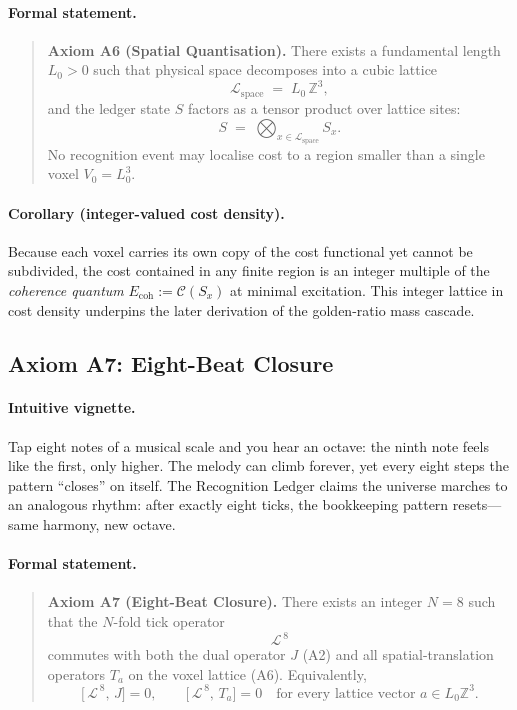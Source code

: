\documentclass[11pt]{article}
\begin{document}
\paragraph{Formal statement.}
\begin{quote}
\textbf{Axiom A6 (Spatial Quantisation).}  
There exists a fundamental length \(L_{0} > 0\) such that physical space decomposes into a cubic lattice
\[
\mathcal{L}_{\text{space}} \;=\; L_{0}\,\mathbb{Z}^{3},
\]
and the ledger state \(S\) factors as a tensor product over lattice sites:
\[
S \;=\; \bigotimes_{x\in\mathcal{L}_{\text{space}}} S_{x}.
\]
No recognition event may localise cost to a region smaller than a single voxel \(V_{0} = L_{0}^{3}\).
\end{quote}

\paragraph{Corollary (integer-valued cost density).}
Because each voxel carries its own copy of the cost functional yet cannot be subdivided, the cost contained in any finite region is an integer multiple of the \emph{coherence quantum} \(E_{\text{coh}} := \mathcal{C}(S_{x})\) at minimal excitation.  This integer lattice in cost density underpins the later derivation of the golden-ratio mass cascade.

\subsection{Axiom A7: Eight-Beat Closure}
\label{subsec:axiom-a7}

\paragraph{Intuitive vignette.}
Tap eight notes of a musical scale and you hear an octave: the ninth note feels like the first, only higher. The melody can climb forever, yet every eight steps the pattern “closes” on itself. The Recognition Ledger claims the universe marches to an analogous rhythm: after exactly eight ticks, the bookkeeping pattern resets—same harmony, new octave.

\paragraph{Formal statement.}
\begin{quote}
\textbf{Axiom A7 (Eight-Beat Closure).}  
There exists an integer \(N=8\) such that the \(N\)-fold tick operator
\[
\mathcal{L}^{\,8}
\]
commutes with both the dual operator \(J\) (A2) and all spatial-translation operators \(T_{a}\) on the voxel lattice (A6). Equivalently,
\[
\bigl[\,\mathcal{L}^{\,8},\,J\bigr]=0,
\qquad
\bigl[\,\mathcal{L}^{\,8},\,T_{a}\bigr]=0
\quad\text{for every lattice vector } a\in L_{0}\mathbb{Z}^{3}.
\]
\end{quote}
\end{document}

